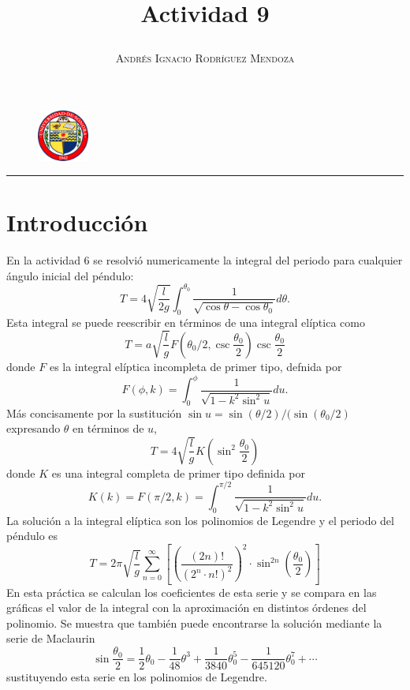 \documentclass[11pt,spanish]{article}
\title{\vspace{-3cm}\begin{flushleft}\textbf{Actividad 9}\end{flushleft}}
\author{\hspace{-9.6cm}\textsc{Andrés Ignacio Rodríguez Mendoza}}
\date{}
\begin{document}
\begin{figure}
  \begin{center}
   \vspace{-5.4cm} \includegraphics[width=0.15\textwidth]{uni}
  \end{center}
\end{figure}

\maketitle  
\begin{center}
\rule{\textwidth}{1pt}
\end{center}

\section*{Introducción}

En la actividad 6 se resolvió numericamente la integral del periodo para cualquier ángulo inicial del péndulo:
$$T= 4 \sqrt{\frac{l}{2g}} \int ^{\theta _0} _0 \frac{1}{\sqrt{\cos\theta - \cos\theta_0}} d\theta.$$
Esta integral se puede reescribir en términos de una integral elíptica como
$$T=a \sqrt{\frac{l}{g}} F \left( \theta_0 / 2 , \csc \frac{\theta _ 0 }{2} \right) \csc \frac{\theta_0}{2} $$
donde $F$ es la integral elíptica incompleta de primer tipo, defnida por
$$F(\phi,k) = \int ^{\phi} _0  \frac{1}{\sqrt{1-k^2 \sin ^ 2 u }} du.$$
Más concisamente por la sustitución $\sin u = \sin (\theta/2) / (\sin (\theta_0 / 2)$  expresando $\theta$ en términos de $u$,
$$T = 4\sqrt{\frac{l}{g}} K \left( \sin ^ 2 \frac{\theta _ 0 }{2}  \right)$$
donde $K$ es una integral completa de primer tipo definida por
$$K(k) = F(\pi /2,k) = \int ^{\pi/2} _ 0 \frac{1}{\sqrt{1-k^2 \sin^2 u}} du .$$
La solución a la integral elíptica son los polinomios de Legendre y el periodo del péndulo es
$$T = 2 \pi \sqrt{\frac{l}{g}} \sum\limits_{n=0}^{\infty} \left[ \left( \frac{(2n)!}{(2^n \cdot n!)^2 } \right)^2  \cdot \sin ^{2n} \left( \frac{\theta_0}{2} \right) \right]$$
En esta práctica se calculan los coeficientes de esta serie y se compara en las gráficas el valor de la integral con la aproximación en distintos órdenes del polinomio. Se muestra que también puede encontrarse la solución mediante la serie de Maclaurin
$$\sin \frac{\theta_0}{2} = \frac{1}{2} \theta_0 - \frac{1}{48} \theta ^3 + \frac{1}{3840} \theta_0 ^5 - \frac{1}{645120} \theta _0 ^7 + \cdots $$
sustituyendo esta serie en los polinomios de Legendre.
\end{document}
